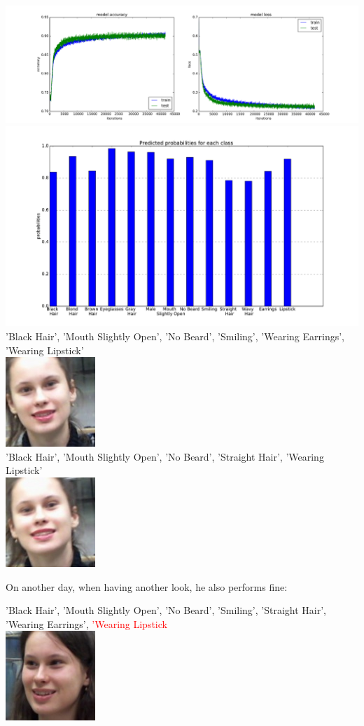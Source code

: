 \documentclass[12.5pt]{scrartcl}
\begin{document}
	\includegraphics[width=\linewidth]{images/lossGood}\\
	\includegraphics[width=0.8\linewidth]{images/accuracy_on_classes}
	'Black Hair', 'Mouth Slightly Open', 'No Beard', 'Smiling', 'Wearing Earrings', 'Wearing Lipstick' \\
	\includegraphics[height=0.1\textheight]{images/leti_normalised110} \\ 
	'Black Hair', 'Mouth Slightly Open', 'No Beard', 'Straight Hair', 'Wearing Lipstick' \\
	\includegraphics[height=0.1\textheight]{images/leti_normalised111} 
	
	On another day, when having another look, he also performs fine:
	
	'Black Hair', 'Mouth Slightly Open', 'No Beard', 'Smiling', 'Straight Hair', 'Wearing Earrings', \textcolor{red}{'Wearing Lipstick}
	 \\
	\includegraphics[height=0.1\textheight]{images/leti_normalised24}\\
	
\end{document}
